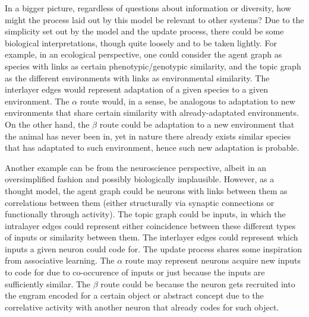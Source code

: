 In a bigger picture, regardless of questions about information or diversity, how might the process laid out by this model be relevant to other systems? Due to the simplicity set out by the model and the update process, there could be some biological interpretations, though quite loosely and to be taken lightly. For example, in an ecological perspective, one could consider the agent graph as species with links as certain phenotypic/genotypic similarity, and the topic graph as the different environments with links as environmental similarity. The interlayer edges would represent adaptation of a given species to a given environment. The $\alpha$ route would, in a sense, be analogous to adaptation to new environments that share certain similarity with already-adaptated environments. On the other hand, the $\beta$ route could be adaptation to a new environment that the animal has never been in, yet in nature there already exists similar species that has adaptated to such environment, hence such new adaptation is probable.

Another example can be from the neuroscience perspective, albeit in an oversimplified fashion and possibly biologically implausible. However, as a thought model, the agent graph could be neurons with links between them as correlations between them (either structurally via synaptic connections or functionally through activity). The topic graph could be inputs, in which the intralayer edges could represent either coincidence between these different types of inputs or similarity between them. The interlayer edges could represent which inputs a given neuron could code for. The update process shares some inspiration from associative learning. The $\alpha$ route may represent neurons acquire new inputs to code for due to co-occurence of inputs or just because the inputs are sufficiently similar. The $\beta$ route could be because the neuron gets recruited into the engram encoded for a certain object or abstract concept due to the correlative activity with another neuron that already codes for such object.
